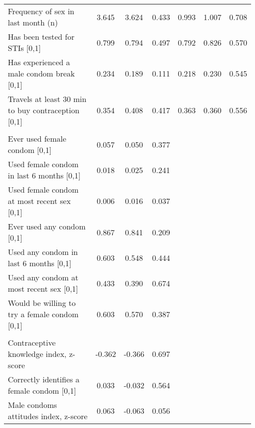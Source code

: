 \begin{table}
\begin{tabular}[t]{lcccccc}
\hspace{1em}Frequency of sex in last month (n) & 3.645 & 3.624 & 0.433 & 0.993 & 1.007 & 0.708\\
\rowcolor{gray!6}  \hspace{1em}Has been tested for STIs [0,1] & 0.799 & 0.794 & 0.497 & 0.792 & 0.826 & 0.570\\
\hspace{1em}Has experienced a male condom break [0,1] & 0.234 & 0.189 & 0.111 & 0.218 & 0.230 & 0.545\\
\rowcolor{gray!6}  \hspace{1em}Travels at least 30 min to buy contraception [0,1] & 0.354 & 0.408 & 0.417 & 0.363 & 0.360 & 0.556\\
\addlinespace[0.3em]
\multicolumn{7}{l}{\textit{Primary outcomes}}\\
\hspace{1em}Ever used female condom [0,1] & 0.057 & 0.050 & 0.377 &  &  & \\
\rowcolor{gray!6}  \hspace{1em}Used female condom in last 6 months [0,1] & 0.018 & 0.025 & 0.241 &  &  & \\
\hspace{1em}Used female condom at most recent sex [0,1] & 0.006 & 0.016 & 0.037 &  &  & \\
\rowcolor{gray!6}  \hspace{1em}Ever used any condom [0,1] & 0.867 & 0.841 & 0.209 &  &  & \\
\hspace{1em}Used any condom in last 6 months [0,1] & 0.603 & 0.548 & 0.444 &  &  & \\
\rowcolor{gray!6}  \hspace{1em}Used any condom at most recent sex [0,1] & 0.433 & 0.390 & 0.674 &  &  & \\
\hspace{1em}Would be willing to try a female condom [0,1] & 0.603 & 0.570 & 0.387 &  &  & \\
\rowcolor{gray!6}  \addlinespace[0.3em]
\multicolumn{7}{l}{\textit{Secondary outcomes}}\\
\hspace{1em}Contraceptive knowledge index, z-score & -0.362 & -0.366 & 0.697 &  &  & \\
\hspace{1em}Correctly identifies a female condom [0,1] & 0.033 & -0.032 & 0.564 &  &  & \\
\rowcolor{gray!6}  \hspace{1em}Male condoms attitudes index, z-score & 0.063 & -0.063 & 0.056 &  &  & \\

\end{tabular}
\end{table}
